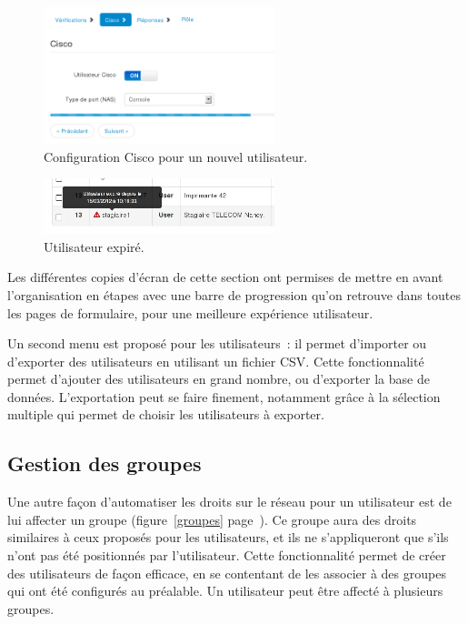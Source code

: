 \begin{figure}[!h]
	\begin{center}
	    \includegraphics[width=0.6\textwidth]{img/userscisco.png}
	\end{center}
	\caption{Configuration Cisco pour un nouvel utilisateur.}
	\label{userscisco}
\end{figure}

\begin{figure}[!h]
	\begin{center}
	    \includegraphics[width=0.6\textwidth]{img/usersexp.png}
	\end{center}
	\caption{Utilisateur expiré.}
	\label{usersexp}
\end{figure}

Les différentes copies d'écran de cette section ont permises de mettre en avant l'organisation en étapes avec une barre de progression qu'on retrouve dans toutes les pages de formulaire, pour une meilleure expérience utilisateur.

Un second menu est proposé pour les utilisateurs~: il permet d'importer ou d'exporter des utilisateurs en utilisant un fichier CSV. Cette fonctionnalité permet d'ajouter des utilisateurs en grand nombre, ou d'exporter la base de données. L'exportation peut se faire finement, notamment grâce à la sélection multiple qui permet de choisir les utilisateurs à exporter.

\subsection{Gestion des groupes}

Une autre façon d'automatiser les droits sur le réseau pour un utilisateur est de lui affecter un groupe (figure~\ref{groupes} page~\pageref{groupes}). Ce groupe aura des droits similaires à ceux proposés pour les utilisateurs, et ils ne s'appliqueront que s'ils n'ont pas été positionnés par l'utilisateur. Cette fonctionnalité permet de créer des utilisateurs de façon efficace, en se contentant de les associer à des groupes qui ont été configurés au préalable. Un utilisateur peut être affecté à plusieurs groupes.

